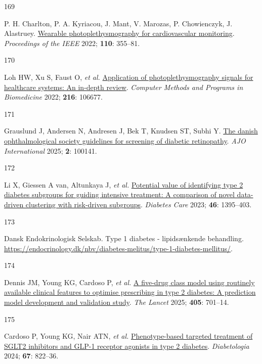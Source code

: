 \documentclass[
  a4paper,
  headsepline=true,
  open=any]{scrbook}
\newlength{\cslhangindent}
\newlength{\csllabelwidth}
\newlength{\cslentryspacingunit} %
\newenvironment{CSLReferences}[2] %
 {%
  \setlength{\parindent}{0pt}
  \ifodd #1
  \let\oldpar\par
  \def\par{\hangindent=\cslhangindent\oldpar}
  \fi
  \setlength{\parskip}{#2\cslentryspacingunit}
 }%
 {}
\newcommand{\CSLLeftMargin}[1]{\parbox[t]{\csllabelwidth}{#1}}
\newcommand{\CSLRightInline}[1]{\parbox[t]{\linewidth - \csllabelwidth}{#1}\break}
\begin{document}
\begin{CSLReferences}{0}{0}
\leavevmode{}%
\CSLLeftMargin{169 }%
\CSLRightInline{P. H. Charlton, P. A. Kyriacou, J. Mant, V. Marozas, P.
Chowienczyk, J. Alastruey.
\href{https://doi.org/10.1109/JPROC.2022.3149785}{Wearable
photoplethysmography for cardiovascular monitoring}. \emph{Proceedings
of the IEEE} 2022; \textbf{110}: 355--81.}

\leavevmode{}%
\CSLLeftMargin{170 }%
\CSLRightInline{Loh HW, Xu S, Faust O, \emph{et al.}
\href{https://doi.org/10.1016/j.cmpb.2022.106677}{Application of
photoplethysmography signals for healthcare systems: An in-depth
review}. \emph{Computer Methods and Programs in Biomedicine} 2022;
\textbf{216}: 106677.}

\leavevmode{}%
\CSLLeftMargin{171 }%
\CSLRightInline{Grauslund J, Andersen N, Andresen J, Bek T, Knudsen ST,
Subhi Y. \href{https://doi.org/10.1016/j.ajoint.2025.100141}{The danish
ophthalmological society guidelines for screening of diabetic
retinopathy}. \emph{AJO International} 2025; \textbf{2}: 100141.}

\leavevmode{}%
\CSLLeftMargin{172 }%
\CSLRightInline{Li X, Giessen A van, Altunkaya J, \emph{et al.}
\href{https://doi.org/10.2337/dc22-2170}{Potential value of identifying
type 2 diabetes subgroups for guiding intensive treatment: A comparison
of novel data-driven clustering with risk-driven subgroups}.
\emph{Diabetes Care} 2023; \textbf{46}: 1395--403.}

\leavevmode{}%
\CSLLeftMargin{173 }%
\CSLRightInline{Dansk Endokrinologisk Selskab. Type 1 diabetes -
lipidsænkende behandling.
\url{https://endocrinology.dk/nbv/diabetes-melitus/type-1-diabetes-mellitus/}.}

\leavevmode{}%
\CSLLeftMargin{174 }%
\CSLRightInline{Dennis JM, Young KG, Cardoso P, \emph{et al.}
\href{https://doi.org/10.1016/S0140-6736(24)02617-5}{A five-drug class
model using routinely available clinical features to optimise
prescribing in type 2 diabetes: A prediction model development and
validation study}. \emph{The Lancet} 2025; \textbf{405}: 701--14.}

\leavevmode{}%
\CSLLeftMargin{175 }%
\CSLRightInline{Cardoso P, Young KG, Nair ATN, \emph{et al.}
\href{https://doi.org/10.1007/s00125-024-06099-3}{Phenotype-based
targeted treatment of SGLT2 inhibitors and GLP-1 receptor agonists in
type 2 diabetes}. \emph{Diabetologia} 2024; \textbf{67}: 822--36.}


\end{CSLReferences}
\end{document}
